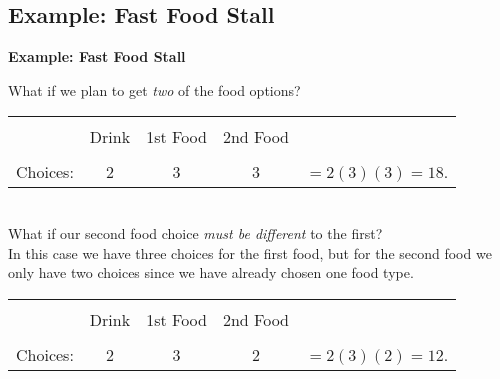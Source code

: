 \documentclass[compress]{beamer}        %
\makeatletter
\newcommand{\tcb}{\textcolor{beamer@blendedblue}}
\makeatother
\begin{document}
\subsection{Example: Fast Food Stall}
\begin{frame}{\bf \tcb{Example: Fast Food Stall}}

What if we plan to get \emph{two} of the food options?\\[0.3cm]

\begin{tabular}{l|c|c|c|c}
\cline{2-4}
&&&&\\[-0.4cm]
&Drink & 1st Food & 2nd Food &\\
\cline{2-4}
&&&&\\[-0.4cm]
Choices: & 2 & 3 & 3 & $= 2(3)(3) = 18$. \\
\cline{2-4}
\end{tabular}\\[1cm]


What if our second food choice \emph{must be different} to the first?\\[0.3cm]

In this case we have three choices for the first food, but for the second food we only have two choices since we have already chosen one food type.\\[0.3cm]

\begin{tabular}{l|c|c|c|c}
\cline{2-4}
&&&&\\[-0.4cm]
&Drink & 1st Food & 2nd Food &\\
\cline{2-4}
&&&&\\[-0.4cm]
Choices: & 2 & 3 & 2 & $= 2(3)(2) = 12$. \\
\cline{2-4}
\end{tabular}

\end{frame}
\end{document}
